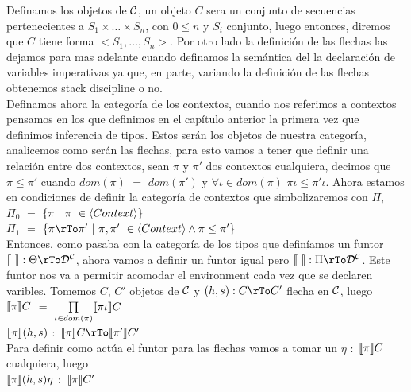 Definamos los objetos de $\mathcal{C}$, un objeto $C$ sera un conjunto de secuencias 
pertenecientes a $S_1 \times \ldots \times S_n$, con $0 \leq n$ y $S_i$ conjunto, 
luego entonces, diremos que $C$ tiene forma $<S_1,\ldots,S_n>$. Por otro lado
la definici\'on de las flechas las dejamos para mas adelante cuando definamos 
la sem\'antica del la declaraci\'on de variables imperativas ya que, en parte,
variando la definici\'on de las flechas obtenemos stack discipline o no.\\

Definamos ahora la categor\'ia de los contextos, cuando nos referimos a contextos
pensamos en los que definimos en el cap\'itulo anterior la primera vez que definimos
inferencia de tipos. Estos ser\'an los objetos de nuestra categor\'ia, analicemos
como ser\'an las flechas, para esto vamos a tener que definir una relaci\'on
entre dos contextos, sean $\pi$ y $\pi'$ dos contextos cualquiera, decimos que 
$\pi \leq \pi'$ cuando $dom(\pi)$ $=$ $dom(\pi')$ y $\forall \iota \in dom(\pi)$ 
$\pi \iota \leq \pi' \iota$. Ahora estamos en condiciones de definir la 
categor\'ia de contextos que simbolizaremos con $\Pi$,\\

\noindent 
$\Pi_0$ $=$ $\{\pi \ | \ \pi \ \in \langle Context \rangle \}$\\
$\Pi_1$ $=$ $\{\pi \rTo \pi' \ | \ \pi,\pi' \ \in \lrangles{Context} \wedge \pi \leq \pi' \}$\\

Entonces, como pasaba con la categor\'ia de los tipos que defin\'iamos un funtor
$\semBrcks{ \ } : \Theta \rTo \DC$, ahora vamos a definir un funtor igual pero
$\semBrcks{ \ } : \Pi \rTo \DC$. Este funtor nos va a permitir acomodar el environment
cada vez que se declaren varibles. Tomemos $C$, $C'$ objetos de $\mathcal{C}$ y $(h,s): C \rTo C'$
flecha en $\mathcal{C}$, luego\\

\noindent
$\llbracket \pi \rrbracket C$ $=$ $\prod\limits_{\iota \in dom(\pi)} \llbracket \pi \iota \rrbracket C$\\
$\llbracket \pi \rrbracket(h,s)$ $:$ $\semBrcks{\pi}C \rTo \semBrcks{\pi'}C'$\\

\noindent
Para definir como act\'ua el funtor para las flechas vamos a tomar un $\eta$ $:$ $\llbracket \pi \rrbracket C$
cualquiera, luego\\

\noindent
$\llbracket \pi \rrbracket(h,s)\eta$ $:$ $\llbracket \pi \rrbracket C'$\\

